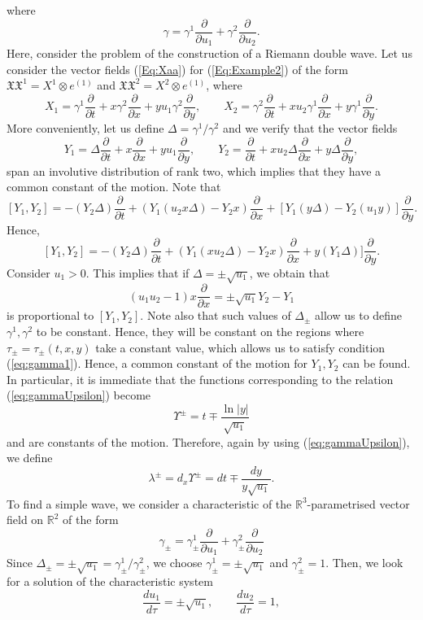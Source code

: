 \documentclass{birkjour}
\theoremstyle{definition}
\theoremstyle{remark}
\numberwithin{equation}{section}
\numberwithin{equation}{section}
\numberwithin{thm}{section}
\numberwithin{equation}{section}
\numberwithin{thm}{section}
\begin{document}
where
$$
\gamma=\gamma^1\frac{\partial}{\partial u_1}+\gamma^2\frac{\partial}{\partial u_2}.
$$
Here, consider the problem of the construction of a Riemann double  wave. Let us consider the vector fields (\ref{Eq:Xaa}) for (\ref{Eq:Example2}) of the form $\mathfrak{X}\!\!\!\!\mathfrak{X}^1=X^1\otimes e^{(1)}$ and $\mathfrak{X}\!\!\!\!\mathfrak{X}^2=X^2\otimes e^{(1)}$, where
$$
X_1=\gamma^1\frac{\partial}{\partial t}+x\gamma^2\frac{\partial}{\partial x}+yu_1\gamma^2\frac{\partial}{\partial y},\qquad X_2=\gamma^2\frac{\partial}{\partial t}+xu_2 \gamma^1\frac{\partial}{\partial x}+y\gamma^1\frac{\partial}{\partial y}.
$$
More conveniently, let us define $\Delta=\gamma^1/\gamma^2$ and we verify that the vector fields
$$
Y_1=\Delta\frac{\partial}{\partial t}+x\frac{\partial}{\partial x}+yu_1\frac{\partial}{\partial y},\qquad Y_2=\frac{\partial}{\partial t}+xu_2\Delta\frac{\partial}{\partial x}+y\Delta\frac{\partial}{\partial y},
$$
span an involutive distribution of rank two, which implies that they have a common constant of the motion. Note that 
$$
[Y_1,Y_2]=-(Y_2\Delta)\frac{\partial}{\partial t}+(Y_1(u_2x\Delta)-Y_2x)\frac{\partial}{\partial x}+[Y_1(y\Delta)-Y_2(u_1y)]\frac{\partial}{\partial y}.
$$
Hence,
$$
[Y_1,Y_2]=-(Y_2\Delta)\frac{\partial}{\partial t}+(Y_1(xu_2\Delta)-Y_2x)\frac{\partial}{\partial x}+y(Y_1\Delta)]\frac{\partial}{\partial y}.
$$Consider $u_1>0$. This implies that if $\Delta=\pm\sqrt{u_1}$, we obtain that
$$
(u_1u_2-1)x\frac{\partial}{\partial x}=\pm\sqrt{u_1}Y_2-Y_1
$$
is proportional to $[Y_1,Y_2]$. Note also that such values of $\Delta_\pm$ allow us to define $\gamma^1,\gamma^2$ to be constant. Hence, they will be constant on the regions where $\tau_\pm=\tau_\pm(t,x,y)$ take a constant value, which allows us to satisfy condition (\ref{eq:gamma1}). Hence, a common constant of the motion for $Y_1,Y_2$ can be found. In particular, it is immediate that the functions corresponding to the relation (\ref{eq:gammaUpsilon}) become
$$
\Upsilon^\pm=t\mp\frac{\ln|y|}{\sqrt{u_1}}
$$
and are constants of the motion. Therefore, again by using (\ref{eq:gammaUpsilon}), we define
$$
\lambda^\pm=d_x\Upsilon^\pm=dt\mp\frac{dy}{y\sqrt{u_1}}.
$$
To find a simple wave, we consider a characteristic of the $\mathbb{R}^3$-parametrised vector field on $\mathbb{R}^2$ of the form
$$
\gamma_\pm=\gamma_\pm^1\frac{\partial}{\partial u_1}+\gamma_\pm^2\frac{\partial}{\partial u_2}
$$
Since $\Delta_\pm=\pm \sqrt{u_1}=\gamma^1_\pm/\gamma_\pm^2$, we choose $\gamma_\pm^1=\pm\sqrt{u_1}$ and $\gamma_\pm^2=1$. Then, we look for a solution of the characteristic system
$$
\frac{du_1}{d\tau}=\pm\sqrt{u_1},\qquad \frac{du_2}{d\tau}=1,
$$
\end{document}
